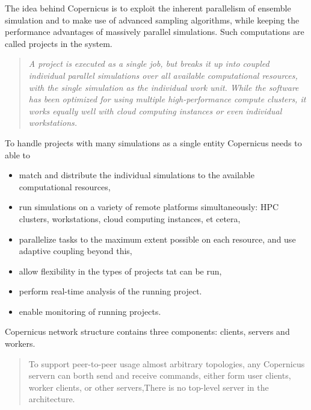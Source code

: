 The idea behind Copernicus is to exploit the inherent parallelism of
ensemble simulation and to make use of advanced sampling algorithms,
while keeping the performance advantages of massively parallel
simulations. Such computations are called projects in the system.

\begin{quote} \slshape
  A project is executed as a single job, but breaks it up into coupled
  individual parallel simulations over all available computational
  resources, with the single simulation as the individual work
  unit. While the software has been optimized for using multiple
  high-performance compute clusters, it works equally well with cloud
  computing instances or even individual
  workstations.\citep{pronk:2011}
\end{quote}

To handle projects with many simulations as a single entity Copernicus
needs to able to
\renewcommand{\labelitemi}{-}
\begin{itemize} \slshape
\item match and distribute the individual simulations to the available
  computational resources,
\item run simulations on a variety of remote platforms simultaneously:
  HPC clusters, workstations, cloud computing instances, et cetera,
\item parallelize tasks to the maximum extent possible on each
  resource, and use adaptive coupling beyond this,
\item allow flexibility in the types of projects tat can be run,
\item perform real-time analysis of the running project.
\item enable monitoring of running projects.\citep{pronk:2011}
\end{itemize}

Copernicus network structure contains three components: clients,
servers and workers.

\begin{quote}
To support peer-to-peer usage almost arbitrary topologies, any
Copernicus servern can borth send and receive commands, either form
user clients, worker clients, or other servers,There is no top-level
server in the architecture.\citep{pronk:2011}
\end{quote}


